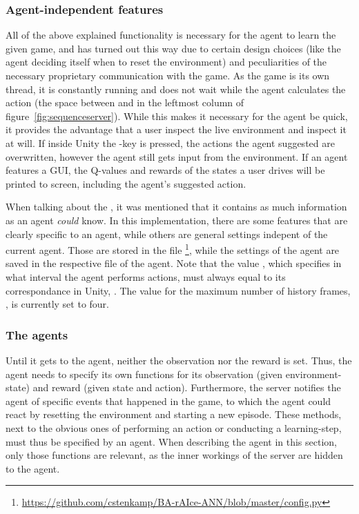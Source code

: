 \subsubsection{Agent-independent features}

All of the above explained functionality is necessary for the agent to learn the given game, and has turned out this way due to certain design choices (like the agent deciding itself when to reset the environment) and peculiarities of the necessary proprietary communication with the game. As the game is its own thread, it is constantly running and does not wait while the agent calculates the action (the space between  and  in the leftmost column of figure~\ref{fig:sequenceserver}). While this makes it necessary for the agent be quick, it provides the advantage that a user inspect the live environment and inspect it at will. If inside Unity the -key is pressed, the actions the agent suggested are overwritten, however the agent still gets input from the environment. If an agent features a GUI, the Q-values and rewards of the states a user drives will be printed to screen, including the agent's suggested action.

When talking about the , it was mentioned that it contains as much information as an agent \textit{could} know. In this implementation, there are some features that are clearly specific to an agent, while others are general settings indepent of the current agent. Those are stored in the file \footnote{\url{https://github.com/cstenkamp/BA-rAIce-ANN/blob/master/config.py}}, while the settings of the agent are saved in the respective file of the agent. Note that the value , which specifies in what interval the agent performs actions, must always equal to its correspondance in Unity, . The value for the maximum number of history frames, , is currently set to four.


\subsubsection{The agents}

Until it gets to the agent, neither the observation nor the reward is set. Thus, the agent needs to specify its own functions for its observation (given environment-state) and reward (given state and action). Furthermore, the server notifies the agent of specific events that happened in the game, to which the agent could react by resetting the environment and starting a new episode. These methods, next to the obvious ones of performing an action or conducting a learning-step, must thus be specified by an agent. When describing the agent in this section, only those functions are relevant, as the inner workings of the server are hidden to the agent.


